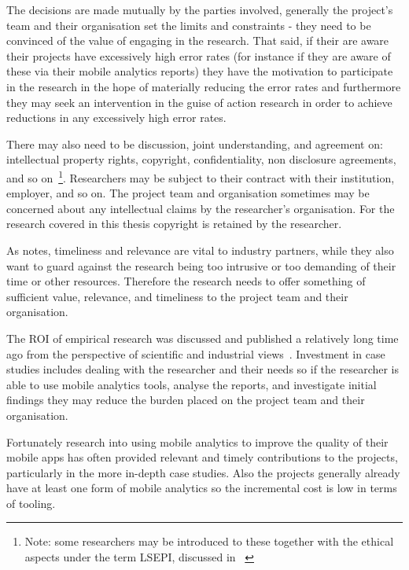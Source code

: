 The decisions are made mutually by the parties involved, generally the project's team and their organisation set the limits and constraints - they need to be convinced of the value of engaging in the research. That said, if their are aware their projects have excessively high error rates (for instance if they are aware of these via their mobile analytics reports) they have the motivation to participate in the research in the hope of materially reducing the error rates and furthermore they may seek an intervention in the guise of action research in order to achieve reductions in any excessively high error rates.

There may also need to be discussion, joint understanding, and agreement on: intellectual property rights, copyright, confidentiality, non disclosure agreements, and so on~\footnote{Note: some researchers may be introduced to these together with the ethical aspects under the term LSEPI, discussed in ~\citet{brooke2018__becoming_professional_a_university_perspective}}. Researchers may be subject to their contract with their institution, employer, and so on. The project team and organisation sometimes may be concerned about any intellectual claims by the researcher's organisation. For the research covered in this thesis copyright is retained by the researcher.

As \citet[p.324]{barroca_2018_bridging_the_gap} notes, timeliness and relevance are vital to industry partners, while they also want to guard against the research being too intrusive or too demanding of their time or other resources. Therefore the research needs to offer something of sufficient value, relevance, and timeliness to the project team and their organisation. 

The ROI of empirical research was discussed and published a relatively long time ago from the perspective of scientific and industrial views~\citet[pp. 54-57]{prechelt_2007_optimizing_ROI_for_empirical_SE_studies}. Investment in case studies includes dealing with the researcher and their needs so if the researcher is able to use mobile analytics tools, analyse the reports, and investigate initial findings they may reduce the burden placed on the project team and their organisation.

Fortunately research into using mobile analytics to improve the quality of their mobile apps has often provided relevant and timely contributions to the projects, particularly in the more in-depth case studies. Also the projects generally already have at least one form of mobile analytics so the incremental cost is low in terms of tooling.
 
